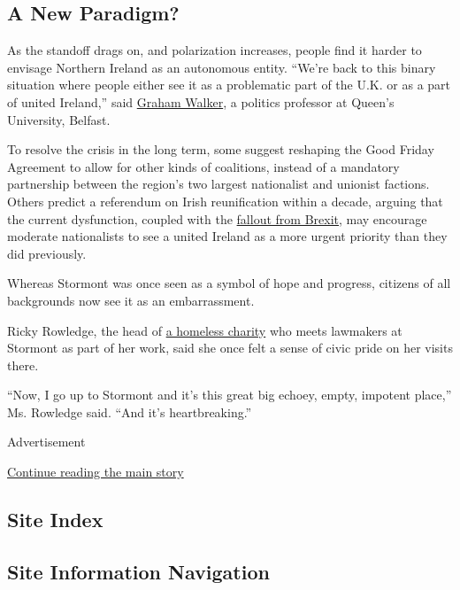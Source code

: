 \hypertarget{a-new-paradigm}{%
\subsection{A New Paradigm?}\label{a-new-paradigm}}

As the standoff drags on, and polarization increases, people find it
harder to envisage Northern Ireland as an autonomous entity. ``We're
back to this binary situation where people either see it as a
problematic part of the U.K. or as a part of united Ireland,'' said
\href{http://www.qub.ac.uk/research-centres/CentreforIrishPolitics/Staff/ProfGrahamWalker/}{Graham
Walker}, a politics professor at Queen's University, Belfast.

To resolve the crisis in the long term, some suggest reshaping the Good
Friday Agreement to allow for other kinds of coalitions, instead of a
mandatory partnership between the region's two largest nationalist and
unionist factions. Others predict a referendum on Irish reunification
within a decade, arguing that the current dysfunction, coupled with the
\href{https://www.nytimes.com/2017/08/05/world/europe/brexit-northern-ireland-ireland.html}{fallout
from Brexit}, may encourage moderate nationalists to see a united
Ireland as a more urgent priority than they did previously.

Whereas Stormont was once seen as a symbol of hope and progress,
citizens of all backgrounds now see it as an embarrassment.

Ricky Rowledge, the head of
\href{http://www.chni.org.uk/directorate.html}{a homeless charity} who
meets lawmakers at Stormont as part of her work, said she once felt a
sense of civic pride on her visits there.

``Now, I go up to Stormont and it's this great big echoey, empty,
impotent place,'' Ms. Rowledge said. ``And it's heartbreaking.''

Advertisement

\protect\hyperlink{after-bottom}{Continue reading the main story}

\hypertarget{site-index}{%
\subsection{Site Index}\label{site-index}}

\hypertarget{site-information-navigation}{%
\subsection{Site Information
Navigation}\label{site-information-navigation}}

